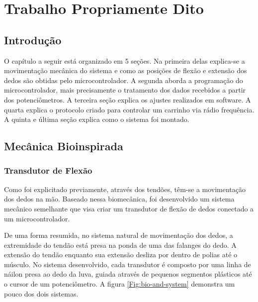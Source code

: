 \documentclass[
	12pt,				%
	openright,			%
	oneside,			%
	a4paper,			%
	english,			%
	brazil				%
	]{abntex2}
\begin{document}
%
%
	
	\chapter{Trabalho Propriamente Dito}

		\section{Introdução}
		
		O capítulo a seguir está organizado em 5 seções. Na primeira delas explica-se a movimentação mecânica do sistema e como as posições de flexão e extensão dos dedos são obtidas pelo microcontrolador. A segunda aborda a programação do microcontrolador, mais precisamente o tratamento dos dados recebidos a partir dos potenciômetros. A terceira seção explica os ajustes realizados em software. A quarta explica o protocolo criado para controlar um carrinho via rádio frequência. A quinta e última seção explica como o sistema foi montado.



		\section{Mecânica Bioinspirada}

			\subsection{Transdutor de Flexão}

		Como foi explicitado previamente, através dos tendões, têm-se a movimentação dos dedos na mão. Baseado nessa biomecânica, foi desenvolvido um sistema mecânico semelhante que visa criar um transdutor de flexão de dedos conectado a um microcontrolador. 

		De uma forma resumida, no sistema natural de movimentação dos dedos, a extremidade do tendão está presa na ponda de uma das falanges do dedo. A extensão do tendão enquanto sua extensão desliza por dentro de polias até o músculo. No sistema desenvolvido, cada transdutor é composto por uma linha de náilon presa ao dedo da luva, guiada através de pequenos segmentos plásticos até o cursor de um potenciômetro. A figura \ref{Fig:bio-and-system} demonstra um pouco dos dois sistemas.
\end{document}
